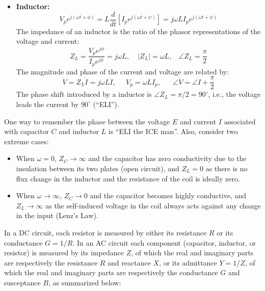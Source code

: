 \documentclass{article}
\begin{document}
\begin{itemize}
\item {\bf Inductor:}
  \begin{equation}
    V_pe^{j(\omega t+\phi)}=L\frac{d}{dt}[I_p e^{j(\omega t+\psi)}]
    =j\omega L I_p e^{j(\omega t+\psi)}
  \end{equation}
  The impedance of an inductor is the ratio of the phasor representations 
  of the voltage and current:
  \begin{equation} 
    Z_L =\frac{V_pe^{j\phi}}{I_pe^{j\psi}} =j\omega L,
    \;\;\;\;|Z_L|=\omega L,\;\;\;\angle Z_L=\frac{\pi}{2}	
  \end{equation}
  The magnitude and phase of the current and voltage are related by:
  \begin{equation}
    \dot{V}=Z_L\dot{I}=j\omega L\dot{I},\;\;\;\;\;
    V_p=\omega LI_p,\;\;\;\;\;\; \angle\dot{V}=\angle\dot{I}+\frac{\pi}{2}
  \end{equation}
  The phase shift introduced by a inductor is $\angle Z_L=\pi/2=90^\circ$,
  i.e., the voltage leads the current by $90^\circ$ (``ELI''). 
\end{itemize}
One way to remember the phase between the voltage $E$ and current $I$ 
associated with capacitor $C$ and inductor $L$ is ``ELI the ICE man''. 
Also, consider two extreme cases:
\begin{itemize}
\item When $\omega=0$, $Z_C\rightarrow \infty$ and the capacitor has zero 
  conductivity due to the insulation between its two plates (open circuit),
  and $Z_L=0$ as there is no flux change in the inductor and the resistance 
  of the coil is ideally zero.
\item When $\omega\rightarrow \infty$, $Z_C\rightarrow 0$ and the capacitor 
  becomes highly conductive, and $Z_L\rightarrow \infty$ as the self-induced
  voltage in the coil always acts against any change in the input (Lenz's Law).
\end{itemize}


In a DC circuit, each resistor is measured by either its resistance $R$ 
or its conductance $G=1/R$. In an AC circuit each component (capacitor, 
inductor, or resistor) is measured by its impedance $Z$, of which the
real and imaginary parts are respectively the resistance $R$ and reactance 
$X$, or its admittance $Y=1/Z$, of which the real and imaginary parts are
respectively the conductance $G$ and susceptance $B$, as summarized below:
\end{document}
